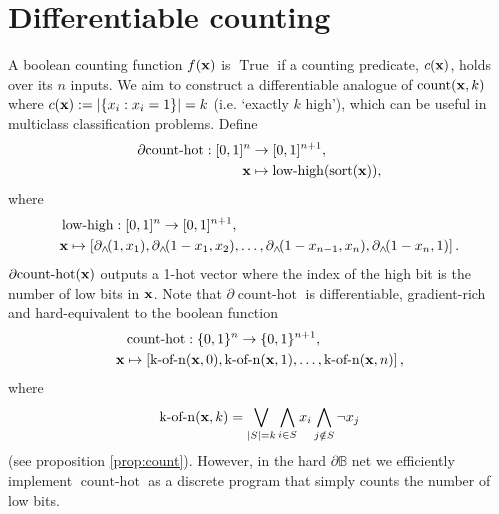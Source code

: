 \documentclass{article}
\theoremstyle{plain}
\theoremstyle{definition}
\theoremstyle{remark}
\begin{document}
\section{Differentiable counting}\label{sec:counting}

A boolean counting function $f({\bf x})$ is $\operatorname{True}$ if a counting predicate, $c({\bf x})$, holds over its $n$ inputs. We aim to construct a differentiable analogue of $\operatorname{count}({\bf x}, k)$ where $c({\bf x}) := |\{x_{i} : x_{i} = 1 \}| = k$ (i.e. `exactly $k$ high'), which can be useful in multiclass classification problems. Define
\begin{equation*}
\begin{aligned}
\partial\!\operatorname{count-hot}: [0,1]^{n} &\to [0,1]^{n+1}, \\
{\bf x} &\mapsto \operatorname{low-high}(\operatorname{sort}({\bf x}))\text{,}
\end{aligned}
\end{equation*}
where 
\begin{equation*}
\begin{aligned}
& \operatorname{low-high}: [0,1]^{n} \to [0,1]^{n+1},\\
& {\bf x} \mapsto \left[ \partial_{\wedge}\!(1, x_{1}), \partial_{\wedge}\!(1 - x_{1}, x_{2}), \dots, 
\partial_{\wedge}\!(1 - x_{n-1}, x_{n}), \partial_{\wedge}\!(1-x_{n}, 1) \right]\text{.}
\end{aligned}
\end{equation*}
$\partial\!\operatorname{count-hot}({\bf x})$ outputs a 1-hot vector where the index of the high bit is the number of low bits in ${\bf x}$. Note that $\partial\!\operatorname{count-hot}$ is differentiable, gradient-rich and hard-equivalent to the boolean function
\begin{equation*}
\begin{aligned}
& \operatorname{count-hot}: \{0,1\}^{n} \to \{0,1\}^{n+1}, \\
{\bf x} &\mapsto \left[\operatorname{k-of-n}({\bf x}, 0), \operatorname{k-of-n}({\bf x}, 1), \dots, \operatorname{k-of-n}({\bf x}, n)\right]\text{,}
\end{aligned}
\end{equation*}
where
\begin{equation*}
\operatorname{k-of-n}({\bf x}, k) = \bigvee_{|S|=k} \bigwedge_{i\in S} x_i \bigwedge_{j\notin S} \neg x_j
\end{equation*}
(see proposition \ref{prop:count}). However, in the hard $\partial\mathbb{B}$ net we efficiently implement $\operatorname{count-hot}$ as a discrete program that simply counts the number of low bits.
\end{document}
